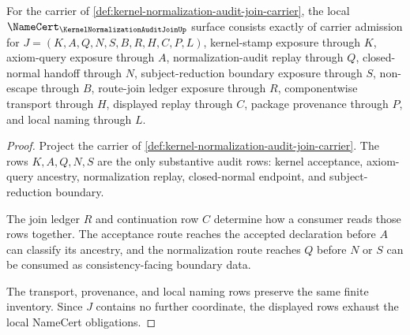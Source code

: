 \begin{theorem}
\label{thm:kernel-normalization-audit-join-namecert-obligations}
For the carrier of \autoref{def:kernel-normalization-audit-join-carrier}, the local $\NameCert_{\KernelNormalizationAuditJoinUp}$ surface consists exactly of carrier admission for $J=(K,A,Q,N,S,B,R,H,C,P,L)$, kernel-stamp exposure through $K$, axiom-query exposure through $A$, normalization-audit replay through $Q$, closed-normal handoff through $N$, subject-reduction boundary exposure through $S$, non-escape through $B$, route-join ledger exposure through $R$, componentwise transport through $H$, displayed replay through $C$, package provenance through $P$, and local naming through $L$.
\end{theorem}
\begin{proof}
Project the carrier of \autoref{def:kernel-normalization-audit-join-carrier}. The rows $K,A,Q,N,S$ are the only substantive audit rows: kernel acceptance, axiom-query ancestry, normalization replay, closed-normal endpoint, and subject-reduction boundary.

The join ledger $R$ and continuation row $C$ determine how a consumer reads those rows together. The acceptance route reaches the accepted declaration before $A$ can classify its ancestry, and the normalization route reaches $Q$ before $N$ or $S$ can be consumed as consistency-facing boundary data.

The transport, provenance, and local naming rows preserve the same finite inventory. Since $J$ contains no further coordinate, the displayed rows exhaust the local NameCert obligations.
\end{proof}

